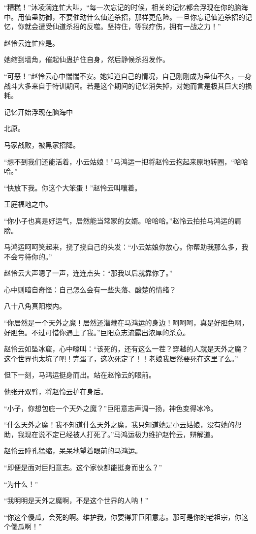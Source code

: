 \begin{this_body}
“糟糕！”沐凌澜连忙大叫，“每一次忘记的时候，相关的记忆都会浮现在你的脑海中。用仙蛊防御，不要催动什么仙道杀招，那样更危险。一旦你忘记仙道杀招的记忆，你就会遭受仙道杀招的反噬。坚持住，等我疗伤，拥有一战之力！”

赵怜云连忙应是。

她缩到墙角，催起仙蛊护住自身，然后静候杀招发作。

“可恶！”赵怜云心中惴惴不安。她知道自己的情况，自己刚刚成为蛊仙不久，一身战斗大多来自于特训期间。若是这个期间的记忆消失掉，对她而言是极其巨大的损耗。

记忆开始浮现在脑海中

北原。

马家战败，被黑家招降。

“想不到我们还能活着，小云姑娘！”马鸿运一把将赵怜云抱起来原地转圈，“哈哈哈。”

“快放下我。你这个大笨蛋！”赵怜云叫嚷着。

王庭福地之中。

“你小子也真是好运气，居然能当常家的女婿。哈哈哈。”赵怜云拍拍马鸿运的肩膀。

马鸿运呵呵笑起来，挠了挠自己的头发：“小云姑娘你放心。你帮助我那么多，我不会亏待你的。”

赵怜云大声嗯了一声，连连点头：“那我以后就靠你了。”

心中则暗自奇怪：自己怎么会有一些失落、酸楚的情绪？

八十八角真阳楼内。

“你居然是一个天外之魔！居然还潜藏在马鸿运的身边！呵呵呵，真是好胆色啊，好胆色。不过可惜你遇上了我。”巨阳意志流露出浓厚的杀意。

赵怜云如坠冰窟，心中嚎叫：“该死的，还有这么一茬？穿越的人就是天外之魔？这个世界也太坑了吧！完蛋了，这次死定了！！老娘我居然要死在这里了么。”

但下一刻，马鸿运挺身而出。站在赵怜云的眼前。

他张开双臂，将赵怜云护在身后。

“小子，你想包庇一个天外之魔？”巨阳意志声调一扬，神色变得冰冷。

“什么天外之魔！我不知道什么天外之魔，我只知道她是小云姑娘，没有她的帮助，我现在说不定已经被人打死了。”马鸿运极力维护赵怜云，辩解道。

赵怜云瞳孔猛缩，呆呆地望着眼前的马鸿运。

“即便是面对巨阳意志。这个家伙都能挺身而出么？”

“为什么！”

“我明明是天外之魔啊，不是这个世界的人呐！”

“你这个傻瓜，会死的啊。维护我，你要得罪巨阳意志。那可是你的老祖宗，你这个傻瓜啊！”


\end{this_body}
